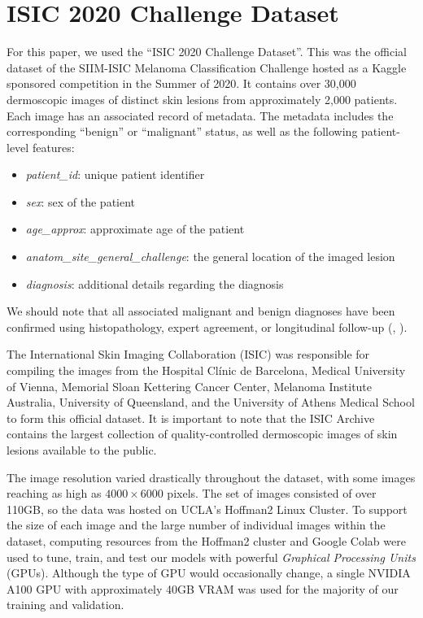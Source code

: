 \documentclass [MAS] {uclathes}
\begin{document}
\section{ISIC 2020 Challenge Dataset}

For this paper, we used the ``ISIC 2020 Challenge Dataset''. This was the official dataset of the SIIM-ISIC Melanoma Classification Challenge hosted as a Kaggle sponsored competition in the Summer of 2020. It contains over 30,000 dermoscopic images of distinct skin lesions from approximately 2,000 patients. Each image has an associated record of metadata. The metadata includes the corresponding ``benign'' or ``malignant'' status, as well as the following patient-level features: 

\begin{itemize}
    \item \textit{patient\_id}: unique patient identifier
    \item \textit{sex}: sex of the patient 
    \item \textit{age\_approx}: approximate age of the patient
    \item \textit{anatom\_site\_general\_challenge}: the general location of the imaged lesion
    \item \textit{diagnosis}: additional details regarding the diagnosis
\end{itemize}

We should note that all associated malignant and benign diagnoses have been confirmed using histopathology, expert agreement, or longitudinal follow-up (\cite{ISIC}, \cite{ISIC2}).

The International Skin Imaging Collaboration (ISIC) was responsible for compiling the images from the Hospital Clínic de Barcelona, Medical University of Vienna, Memorial Sloan Kettering Cancer Center, Melanoma Institute Australia, University of Queensland, and the University of Athens Medical School to form this official dataset. It is important to note that the ISIC Archive contains the largest collection of quality-controlled dermoscopic images of skin lesions available to the public. 

The image resolution varied drastically throughout the dataset, with some images reaching as high as $4000 \times 6000$ pixels. The set of images consisted of over 110GB, so the data was hosted on UCLA's Hoffman2 Linux Cluster. To support the size of each image and the large number of individual images within the dataset, computing resources from the Hoffman2 cluster and Google Colab were used to tune, train, and test our models with powerful \textit{Graphical Processing Units} (GPUs). Although the type of GPU would occasionally change, a single NVIDIA A100 GPU with approximately 40GB VRAM was used for the majority of our training and validation.
\end{document}
